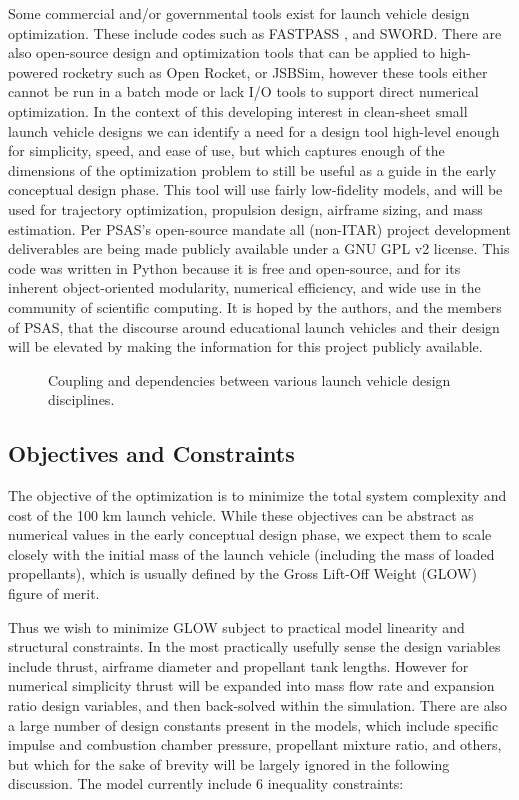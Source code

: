 \documentclass[]{aiaa-tc}%
\begin{document}
Some commercial and/or governmental tools exist for launch vehicle design optimization. These include codes such as FASTPASS \cite{Fastpass}, and SWORD\cite{SWORD}. There are also open-source design and optimization tools that can be applied to high-powered rocketry such as Open Rocket\cite{openrocket}, or JSBSim\cite{jsbsim}, however these tools either cannot be run in a batch mode or lack I/O tools to support direct numerical optimization. In the context of this developing interest in clean-sheet small launch vehicle designs we can identify a need for a design tool high-level enough for simplicity, speed, and ease of use, but which captures enough of the dimensions of the optimization problem to still be useful as a guide in the early conceptual design phase. This tool will use fairly low-fidelity models, and will be used for trajectory optimization, propulsion design, airframe sizing, and mass estimation. Per PSAS’s open-source mandate all (non-ITAR) project development deliverables are being made publicly available under a GNU GPL v2 license\cite{Git}. This code was written in Python because it is free and open-source, and for its inherent object-oriented modularity, numerical efficiency, and wide use in the community of scientific computing. It is hoped by the authors, and the members of PSAS, that the discourse around educational launch vehicles and their design will be elevated by making the information for this project publicly available.

\begin{figure}[ht]
    \centering
    
    \caption{Coupling and dependencies between various launch vehicle design disciplines.}
	\label{fig:coupling}
\end{figure}

\subsection{Objectives and Constraints}
The objective of the optimization is to minimize the total system complexity and cost of the 100 km launch vehicle. While these objectives can be abstract as numerical values in the early conceptual design phase, we expect them to scale closely with the initial mass of the launch vehicle (including the mass of loaded propellants), which is usually defined by the Gross Lift-Off Weight (GLOW) figure of merit.  

Thus we wish to minimize GLOW subject to practical model linearity and structural constraints. In the most practically usefully sense the design variables include thrust, airframe diameter and propellant tank lengths. However for numerical simplicity thrust will be expanded into mass flow rate and expansion ratio design variables, and then back-solved within the simulation. There are also a large number of design constants present in the models, which include specific impulse and combustion chamber pressure, propellant mixture ratio, and others, but which for the sake of brevity will be largely ignored in the following discussion. The model currently include 6 inequality constraints:
\end{document}
